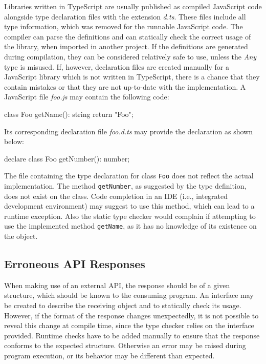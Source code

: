 Libraries written in TypeScript are usually published as compiled JavaScript code alongside type declaration files with the extension \emph{d.ts}. These files include all type information, which was removed for the runnable JavaScript code. The compiler can parse the definitions and can statically check the correct usage of the library, when imported in another project. If the definitions are generated during compilation, they can be considered relatively safe to use, unless the \emph{Any} type is misused. If, however, declaration files are created manually for a JavaScript library which is not written in TypeScript, there is a chance that they contain mistakes or that they are not up-to-date with the implementation. A JavaScript file \emph{foo.js} may contain the following code:
\begin{JsCode}[numbers=none]
class Foo {
  getName(): string {
    return "Foo";
  }
}
\end{JsCode}
Its corresponding declaration file \emph{foo.d.ts} may provide the declaration as shown below:
\begin{JsCode}[numbers=none]
declare class Foo {
  getNumber(): number;
}
\end{JsCode}
The file containing the type declaration for class \texttt{Foo} does not reflect the actual implementation. The method \texttt{getNumber}, as suggested by the type definition, does not exist on the class. Code completion in an IDE (i.e., integrated development environment) may suggest to use this method, which can lead to a runtime exception. Also the static type checker would complain if attempting to use the implemented method \texttt{getName}, as it has no knowledge of its existence on the object.

\subsection{Erroneous API Responses}

When making use of an external API, the response should be of a given structure, which should be known to the consuming program. An interface may be created to describe the receiving object and to statically check its usage. However, if the format of the response changes unexpectedly, it is not possible to reveal this change at compile time, since the type checker relies on the interface provided. Runtime checks have to be added manually to ensure that the response conforms to the expected structure. Otherwise an error may be raised during program execution, or its behavior may be different than expected.

